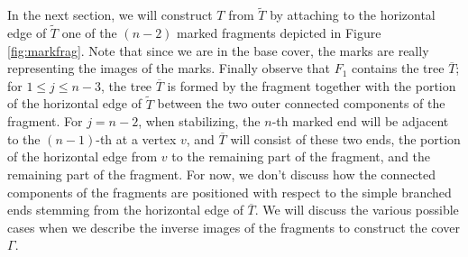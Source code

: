 \documentclass[11pt,reqno]{amsart}
\theoremstyle{definition}
\begin{document}
In the next section,  we will construct $T$ from $\tilde{T}$ by attaching to the horizontal edge of $\tilde{T}$ one of the $(n-2)$ marked fragments depicted in Figure \ref{fig:markfrag}. Note that since we are in the base cover, the marks are really representing the images of the marks.
Finally observe that $F_1$ contains the tree $\overline{T}$; for $1\leq j\leq n-3$, the tree $\overline{T}$ is formed by the fragment together with the portion of the horizontal edge of $\tilde{T}$ between the two outer connected components of the fragment. For $j = n-2$, when stabilizing, the $n$-th marked end will be adjacent to the $(n-1)$-th at a vertex $v$, and $\overline{T}$ will consist of these two ends, the portion of the horizontal edge from $v$ to the remaining part of the fragment, and the remaining part of the fragment.
For now, we don't discuss how the connected components of the fragments are positioned with respect to the simple branched ends stemming from the horizontal edge of $\overline{T}$. We will discuss the various possible cases when we describe the inverse images of the fragments to construct the cover $\Gamma$.

%


\end{document}
